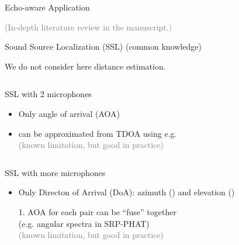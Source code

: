 \begin{frame}[t]{Echo-aware Application \hfill\faBook}
    \begin{center}
        \textcolor{gray}{\small (In-depth literature review in the manuscript.)}
    \end{center}
\end{frame}

\begin{frame}{Sound Source Localization (SSL) {\hfill\small (common knowledge)} \faBook}

    \faAlert We do not consider here distance estimation.

    \begin{columns}[T,onlytextwidth]
        \begin{block}{SSL with 2 microphones}
            \begin{itemize}
                \item Only angle of arrival (\alert{AOA})\iconAOA
                \item can be approximated from \alert{TDOA} using e.g. \GCCPHAT\footnotemark[1]
                \\\textcolor{gray}{\small (known limitation, but good in practice)}
            \end{itemize}
        \end{block}
    \end{columns}
    \pause

    \begin{columns}[T,onlytextwidth]
        \begin{block}{SSL with more microphones}
            \begin{itemize}
                \item Only Directon of Arrival (DoA):  azimuth (\faArrowsAltH) and elevation (\faArrowsAltV)
                \item[1.] AOA for each pair can be ``fuse''  together
                \\(e.g. angular spectra in SRP-PHAT\footnotemark[2])
                \\\textcolor{gray}{\small (known limitation, but good in practice)}
            \end{itemize}
        \end{block}
    \end{columns}


\end{frame}

